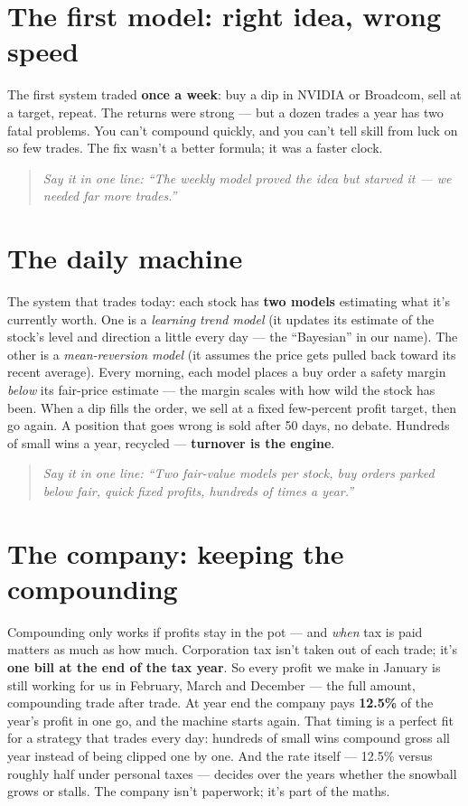 \documentclass[11pt,a4paper]{article}
\newcommand{\oneline}[1]{\begin{quote}\itshape\color{bcteal}Say it in one line:
``#1''\end{quote}}
\begin{document}
\section{The first model: right idea, wrong speed}

The first system traded \textbf{once a week}: buy a dip in NVIDIA or
Broadcom, sell at a target, repeat. The returns were strong --- but a dozen
trades a year has two fatal problems. You can't compound quickly, and you
can't tell skill from luck on so few trades. The fix wasn't a better formula;
it was a faster clock.

\oneline{The weekly model proved the idea but starved it --- we needed far
more trades.}

\section{The daily machine}

The system that trades today: each stock has \textbf{two models} estimating
what it's currently worth. One is a \emph{learning trend model} (it updates
its estimate of the stock's level and direction a little every day --- the
``Bayesian'' in our name). The other is a \emph{mean-reversion model} (it
assumes the price gets pulled back toward its recent average). Every morning,
each model places a buy order a safety margin \emph{below} its fair-price
estimate --- the margin scales with how wild the stock has been. When a dip
fills the order, we sell at a fixed few-percent profit target, then go again.
A position that goes wrong is sold after 50 days, no debate. Hundreds of
small wins a year, recycled --- \textbf{turnover is the engine}.

\oneline{Two fair-value models per stock, buy orders parked below fair,
quick fixed profits, hundreds of times a year.}

\section{The company: keeping the compounding}

Compounding only works if profits stay in the pot --- and \emph{when} tax is
paid matters as much as how much. Corporation tax isn't taken out of each
trade; it's \textbf{one bill at the end of the tax year}. So every profit we
make in January is still working for us in February, March and December ---
the full amount, compounding trade after trade. At year end the company pays
\textbf{12.5\%} of the year's profit in one go, and the machine starts again.
That timing is a perfect fit for a strategy that trades every day: hundreds of
small wins compound gross all year instead of being clipped one by one. And
the rate itself --- 12.5\% versus roughly half under personal taxes --- decides
over the years whether the snowball grows or stalls. The company isn't
paperwork; it's part of the maths.
\end{document}
